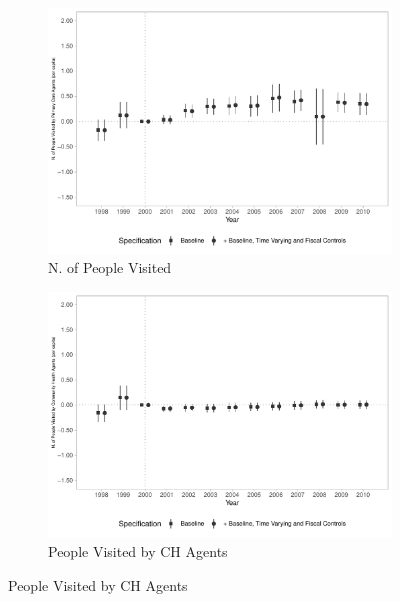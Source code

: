 \begin{figure}[h!]
    \begin{center}
    \caption{Effects on Primary Care Coverage - Intensive Margin}\label{fig:9}
    \begin{subfigure}{0.32\textwidth}
        \caption{\scriptsize N. of People Visited}\label{fig:9a}
        \centering
        \includegraphics[width=\textwidth]{plots/siab_accomp_especif_pcapita_dist_ec29_baseline_dist_ec29_baseline_9.pdf}
    \end{subfigure}
    \begin{subfigure}{0.32\textwidth}
        \centering
        \caption{\scriptsize People Visited by CH Agents}\label{fig:9b}
        \includegraphics[width=\textwidth]{plots/siab_accomp_especif_pacs_pcapita_dist_ec29_baseline_dist_ec29_baseline_9.pdf}

\end{subfigure}
\end{center}
\end{figure}
